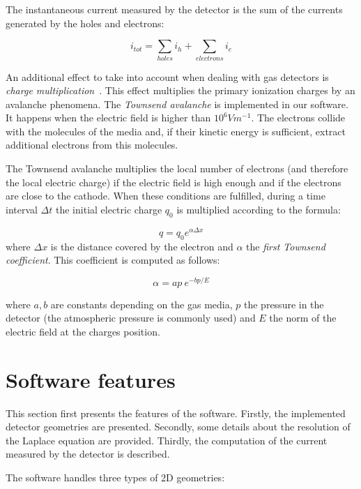 \documentclass[11pt]{article}
\begin{document}
	The instantaneous current measured
	by the detector is the sum of the currents generated by the holes and electrons:

	\begin{equation}
	i_{tot} = \sum_{holes} i_h + \sum_{electrons} i_e
	\label{eq:tot_current}
\end{equation}

	An additional effect to take into account  when dealing with gas detectors is
	\textit{charge multiplication}~\cite{lphy2236}. This effect
	multiplies the primary ionization charges by an avalanche phenomena.
	The \textit{Townsend avalanche} is implemented in our software. It happens
	when the electric field is higher than $10^6Vm^{-1}$. The electrons collide
	with the molecules of the media and, if their kinetic energy is sufficient,
	extract additional electrons from this molecules.

	The Townsend avalanche multiplies the local number of electrons (and therefore the local electric
	charge) if the electric field is high enough and if the electrons are close
	to the cathode. When these conditions are fulfilled, during a time interval
	$\Delta t$ the initial electric charge $q_0$ is multiplied
	according to the formula:

\begin{equation}
	q = q_0 e^{\alpha \Delta x}
	\label{eq:townsend}
\end{equation}
	where $\Delta x$ is the distance covered by the electron and $\alpha$ the
	\textit{first Townsend coefficient}. This coefficient is computed as follows:

	\[\alpha = ap \ e^{-bp/E}\]

	where $a, b$ are constants depending on the gas media, $p$ the pressure in
	the detector (the atmospheric pressure is commonly used) and $E$ the norm
	of the electric field at the charges position.

\section{Software features}

	This section first presents the features of the software. Firstly,
	the implemented detector geometries are presented. Secondly, some details
	about the resolution of the Laplace equation are provided. Thirdly, the
	computation of the current measured by the detector is described.

	The software handles three types of 2D geometries:
\end{document}
